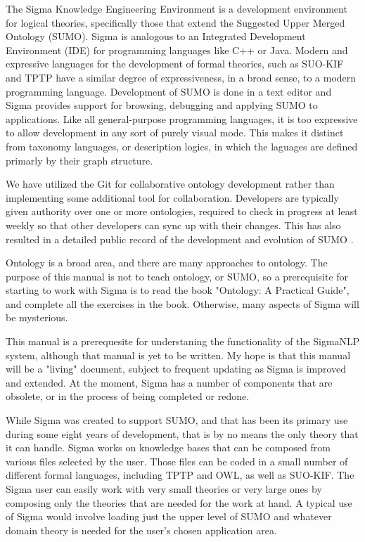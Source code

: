 \documentclass{book}
\begin{document}
The Sigma Knowledge Engineering Environment is a development environment for
logical theories, specifically those that extend the Suggested Upper Merged
Ontology (SUMO).  Sigma is analogous to an Integrated Development Environment
(IDE) for programming languages like C++ or Java.  Modern and expressive
languages for the development of formal theories, such as SUO-KIF
\cite{Pease2009} and TPTP \cite{Sutcliffe:JAR-2009} have a similar
degree of expressiveness, in a broad sense, to a modern programming language.
Development of SUMO is done in a text editor and Sigma provides support for
browsing, debugging and applying SUMO to applications.  Like all general-purpose
programming languages, it is too expressive to allow development in any sort of
purely visual mode.  This makes it distinct from taxonomy languages, or
description logics, in which the laguages are defined primarly by their graph
structure.

We have utilized the Git for collaborative ontology development
rather than implementing some additional tool for collaboration. Developers are
typically given authority over one or more ontologies, required to check in
progress at least weekly so that other developers can sync up with their
changes.  This has also resulted in a detailed public record of the development
and evolution of SUMO \cite{pb10}.

Ontology is a broad area, and there are many approaches to ontology.  The purpose
of this manual is not to teach ontology, or SUMO, so a prerequisite for starting
to work with Sigma is to read the book "Ontology: A Practical Guide", and complete
all the exercises in the book.  Otherwise, many aspects of Sigma will be
mysterious.

This manual is a prerequesite for understaning the functionality of the SigmaNLP
system, although that manual is yet to be written. My hope is that this manual
will be a "living" document, subject to frequent updating as Sigma is improved and
extended.  At the moment, Sigma has a number of components that are obsolete, or
in the process of being completed or redone.

While Sigma \cite{SigmaWeb} \cite{p03} was created to support SUMO, and that has
been its primary use during some eight years of development, that is by no means
the only theory that it can handle.  Sigma works on knowledge bases that can be
composed from various files selected by the user.  Those files can be coded in a
small number of different formal languages, including TPTP and OWL, as well as
SUO-KIF.  The Sigma user can easily work with very small theories or very large
ones by composing only the theories that are needed for the work at hand.  A
typical use of Sigma would involve loading just the upper level of SUMO and
whatever domain theory is needed for the user's chosen application area.
\end{document}
